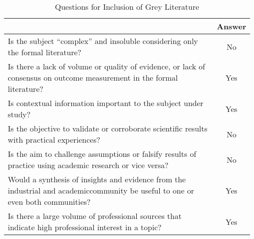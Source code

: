 \begin{table}[!htb]
  \centering
  \caption{Questions for Inclusion of Grey Literature}
  \label{tab:questoesgarousi}
  \footnotesize
  \begin{tabular}{p{12cm}|c}
    \bottomrule
    \rowcolor[rgb]{0.753,0.753,0.753} \multicolumn{1}{c|}{\textbf{Question}}                                                                    & \textbf{Answer} \\
    \hline
    \rowcolor[rgb]{0.898,0.898,0.898} Is the subject “complex” and insoluble considering only the formal literature?                            & No              \\
    Is there a lack of volume or quality of evidence, or lack of consensus on outcome measurement in the formal literature?                     & Yes             \\
    \rowcolor[rgb]{0.898,0.898,0.898} Is contextual information important to the subject under study?                                           & Yes             \\
    Is the objective to validate or corroborate scientific results with practical experiences?                                                  & No              \\
    \rowcolor[rgb]{0.898,0.898,0.898} Is the aim to challenge assumptions or falsify results of practice using academic research or vice versa? & No              \\
    Would a synthesis of insights and evidence from the industrial and academiccommunity be useful to one or even both communities?             & Yes             \\
    \rowcolor[rgb]{0.898,0.898,0.898} Is there a large volume of professional sources that indicate high professional interest in a topic?      & Yes             \\
    \toprule
  \end{tabular}
\end{table}